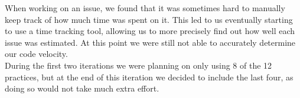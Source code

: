 When working on an issue, we found that it was sometimes hard to manually keep track of how much time was spent on it. This led to us eventually starting to use a time tracking tool, allowing us to more precisely find out how well each issue was estimated. At this point we were still not able to accurately determine our code velocity.\\

During the first two iterations we were planning on only using 8 of the 12 practices, but at the end of this iteration we decided to include the last four, as doing so would not take much extra effort.

